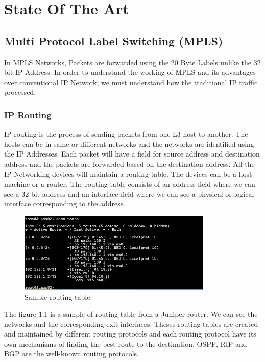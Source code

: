 


\chapter{State Of The Art}
\section{Multi Protocol Label Switching (MPLS)}

In MPLS Networks, Packets are forwarded using the 20 Byte Labels unlike the 32 bit IP Address. In order to understand the working of MPLS and its advantages over conventional IP Network, we must understand how the traditional IP traffic processed. 

\subsection{IP Routing}

IP routing\cite{2008} is the process of sending packets from one L3 host to another. The hosts can be in same or different networks and the networks are identified using the IP Addresses. Each packet will have a field for source address and destination address and the packets are forwarded based on the destination address. All the IP Networking devices will maintain a routing table. The devices can be a host machine or a router. The routing table consists of an address field where we can see a 32 bit address and an interface field where we can see a physical or logical interface corresponding to the address. 

\begin{figure}
       \centering\includegraphics[width=\textwidth]{Final/routing table.png}
       \caption{Sample routing table}
       \label{fig:compbest}
\end{figure}

The figure 1.1 is a sample of routing table from a Juniper router. We can see the networks and the corresponding exit interfaces. Theses routing tables are created and maintained by different routing protocols and each routing protocol have its own mechanisms of finding the best route to the destination. OSPF, RIP and BGP are the well-known routing protocols\cite{2005}.

